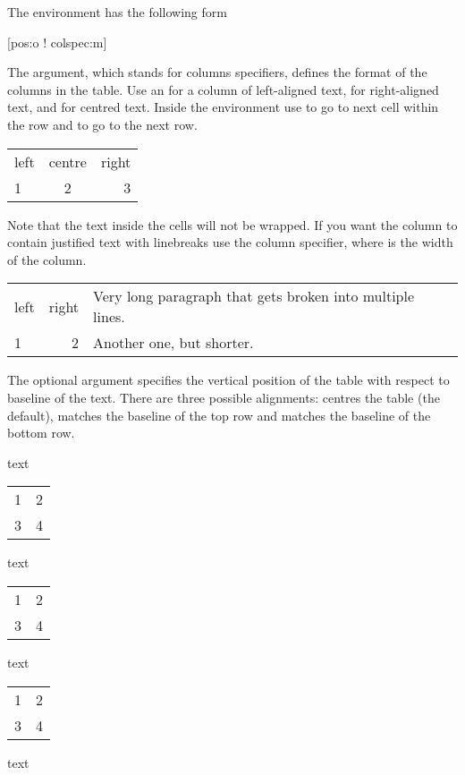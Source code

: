 The environment  has the following form
\begin{lscommand}
  [pos:o ! colspec:m]
\end{lscommand} %
The  argument, which stands for columns specifiers, defines the
format of the columns in the table. Use an  for a column of left-aligned text,
 for right-aligned text, and  for centred text. Inside the
environment use \ai{\&} to go to next cell within the row and
\ci{\textbackslash} to go to the next row.
\begin{example}
\begin{tabular}{lcr}
  left & centre & right \\
  1    & 2      & 3     \\
\end{tabular}
\end{example}
Note that the text inside the cells will not be wrapped. If you want the column
to contain justified text with linebreaks use the 
column specifier, where  is the width of the column.
\begin{example}[examplewidth=0.43\linewidth]
\begin{tabular}{lrp{3cm}}
  left & right & Very long paragraph
                 that gets broken into
                 multiple lines. \\
  1    & 2     & Another one,
                 but shorter. \\
\end{tabular}
\end{example}

The optional  argument specifies the vertical position of the table
with respect to baseline of the text. There are three possible alignments:
 centres the table (the default),  matches the baseline of
the top row and  matches the baseline of the bottom row.
\begin{example}[examplewidth=0.55\linewidth]
text
\begin{tabular}{ll}
  1 & 2 \\
  3 & 4 \\
\end{tabular}
text
\begin{tabular}[t]{ll}
  1 & 2 \\
  3 & 4 \\
\end{tabular}
text
\begin{tabular}[b]{ll}
  1 & 2 \\
  3 & 4 \\
\end{tabular}
text
\end{example}


